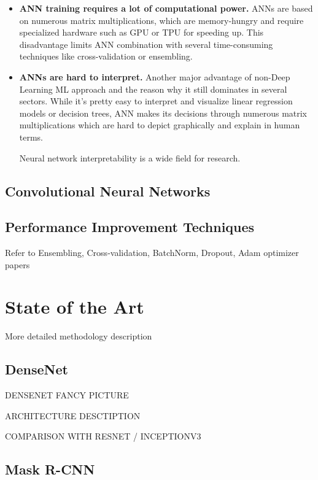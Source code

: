 \documentclass[thesis=B,english]{FITthesis}[2019/12/23]
\begin{document}
\begin{itemize}
	\item \textbf{ANN training requires a lot of computational power.} ANNs are based on numerous matrix multiplications, which are memory-hungry and require specialized hardware such as GPU or TPU for speeding up. This disadvantage limits ANN combination with several time-consuming techniques like cross-validation or ensembling.
	
	\item \textbf{ANNs are hard to interpret.} Another major advantage of non-Deep Learning ML approach and the reason why it still dominates in several sectors. While it's pretty easy to interpret and visualize linear regression models or decision trees, ANN makes its decisions through numerous matrix multiplications which are hard to depict graphically and explain in human terms.
	
	Neural network interpretability is a wide field for research.
\end{itemize} 

\section{Convolutional Neural Networks}



\section{Performance Improvement Techniques}

Refer to Ensembling, Cross-validation, BatchNorm, Dropout, Adam optimizer papers

\chapter{State of the Art}

More detailed methodology description

\section{DenseNet}

DENSENET FANCY PICTURE

ARCHITECTURE DESCTIPTION

COMPARISON WITH RESNET / INCEPTIONV3

\section{Mask R-CNN}
\end{document}
